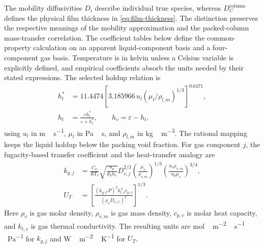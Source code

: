 The mobility diffusivities $D_i$ describe individual true species, whereas $D_C^{\mathrm{column}}$ defines the physical film thickness in \cref{eq:film-thickness}.
The distinction preserves the respective meanings of the mobility approximation and the packed-column mass-transfer correlation.
The coefficient tables below define the common-property calculation on an apparent liquid-component basis and a four-component gas basis.
Temperature is in kelvin unless a Celsius variable is explicitly defined, and empirical coefficients absorb the units needed by their stated expressions.
The selected holdup relation is
\begin{align}
h_l^*&=11.4474\left[3.185966\,u_l(\mu_l/\rho_{l,m})^{1/3}\right]^{0.6471},\\
h_l&=\frac{\varepsilon h_l^*}{\varepsilon+h_l^*},\qquad h_v=\varepsilon-h_l,
\label{eq:common-holdup}
\end{align}
using $u_l$ in \unit{m\,s^{-1}}, $\mu_l$ in \unit{Pa\,s}, and $\rho_{l,m}$ in \unit{kg\,m^{-3}}.
The rational mapping keeps the liquid holdup below the packing void fraction.
For gas component $j$, the fugacity-based transfer coefficient and the heat-transfer analogy are
\begin{align}
k_{g,j}&=\frac{C_V}{RT_v}\sqrt{\frac{a_p}{d_hh_v}}D_{v,j}^{2/3}
\left(\frac{\mu_v}{\rho_{v,m}}\right)^{1/3}
\left(\frac{u_v\rho_{v,m}}{a_p\mu_v}\right)^{3/4},\\
U_T&=\left[\frac{(k_{g,C}P)^3 k_{t,v}^{\,2}c_{p,v}}
{(\rho_vD_{v,C})^2}\right]^{1/3}.
\label{eq:common-gas-heat-transfer}
\end{align}
Here $\rho_v$ is gas molar density, $\rho_{v,m}$ is gas mass density, $c_{p,v}$ is molar heat capacity, and $k_{t,v}$ is gas thermal conductivity.
The resulting units are \unit{mol\,m^{-2}\,s^{-1}\,Pa^{-1}} for $k_{g,j}$ and \unit{W\,m^{-2}\,K^{-1}} for $U_T$.

